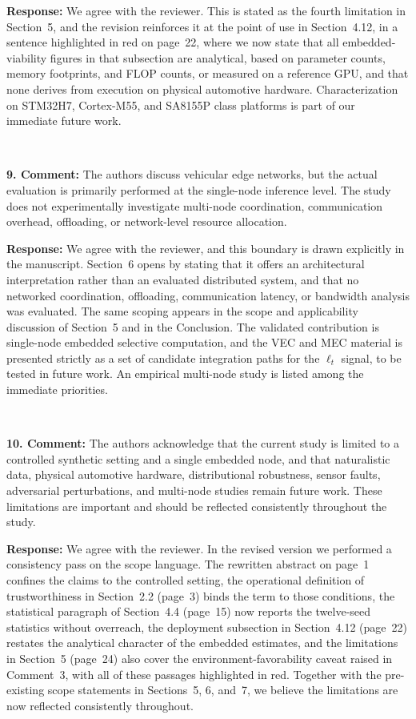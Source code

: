 \documentclass[1p,12pt,authoryear]{elsarticle}
\begin{document}
\vspace{2mm}
\noindent \textbf{Response:} We agree with the reviewer. This is stated as the fourth limitation in Section~5, and the revision reinforces it at the point of use in Section~4.12, in a sentence highlighted in red on page~22, where we now state that all embedded-viability figures in that subsection are analytical, based on parameter counts, memory footprints, and FLOP counts, or measured on a reference GPU, and that none derives from execution on physical automotive hardware. Characterization on STM32H7, Cortex-M55, and SA8155P class platforms is part of our immediate future work.

~

\noindent \textbf{9. Comment:} The authors discuss vehicular edge networks, but the actual evaluation is primarily performed at the single-node inference level. The study does not experimentally investigate multi-node coordination, communication overhead, offloading, or network-level resource allocation.

\vspace{2mm}
\noindent \textbf{Response:} We agree with the reviewer, and this boundary is drawn explicitly in the manuscript. Section~6 opens by stating that it offers an architectural interpretation rather than an evaluated distributed system, and that no networked coordination, offloading, communication latency, or bandwidth analysis was evaluated. The same scoping appears in the scope and applicability discussion of Section~5 and in the Conclusion. The validated contribution is single-node embedded selective computation, and the VEC and MEC material is presented strictly as a set of candidate integration paths for the $\ell_t$ signal, to be tested in future work. An empirical multi-node study is listed among the immediate priorities.

~

\noindent \textbf{10. Comment:} The authors acknowledge that the current study is limited to a controlled synthetic setting and a single embedded node, and that naturalistic data, physical automotive hardware, distributional robustness, sensor faults, adversarial perturbations, and multi-node studies remain future work. These limitations are important and should be reflected consistently throughout the study.

\vspace{2mm}
\noindent \textbf{Response:} We agree with the reviewer. In the revised version we performed a consistency pass on the scope language. The rewritten abstract on page~1 confines the claims to the controlled setting, the operational definition of trustworthiness in Section~2.2 (page~3) binds the term to those conditions, the statistical paragraph of Section~4.4 (page~15) now reports the twelve-seed statistics without overreach, the deployment subsection in Section~4.12 (page~22) restates the analytical character of the embedded estimates, and the limitations in Section~5 (page~24) also cover the environment-favorability caveat raised in Comment~3, with all of these passages highlighted in red. Together with the pre-existing scope statements in Sections~5, 6, and~7, we believe the limitations are now reflected consistently throughout.
\end{document}

